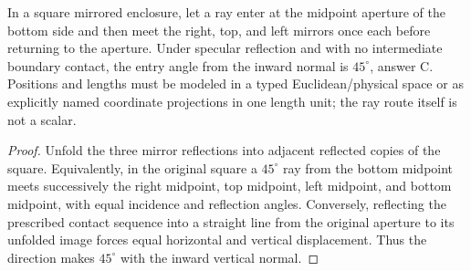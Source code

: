 \begin{theorem}
\label{thm:physics:phyx_mini_0024:target}
In a square mirrored enclosure, let a ray enter at the midpoint aperture of
the bottom side and then meet the right, top, and left mirrors once each
before returning to the aperture. Under specular reflection and with no
intermediate boundary contact, the entry angle from the inward normal is
$45^\circ$, answer C. Positions and lengths must be modeled in a typed
Euclidean/physical space or as explicitly named coordinate projections in one
length unit; the ray route itself is not a scalar.
\end{theorem}
\begin{proof}
Unfold the three mirror reflections into adjacent reflected copies of the
square. Equivalently, in the original square a $45^\circ$ ray from the
bottom midpoint meets successively the right midpoint, top midpoint, left
midpoint, and bottom midpoint, with equal incidence and reflection angles.
Conversely, reflecting the prescribed contact sequence into a straight line
from the original aperture to its unfolded image forces equal horizontal and
vertical displacement. Thus the direction makes $45^\circ$ with the inward
vertical normal.
\end{proof}

